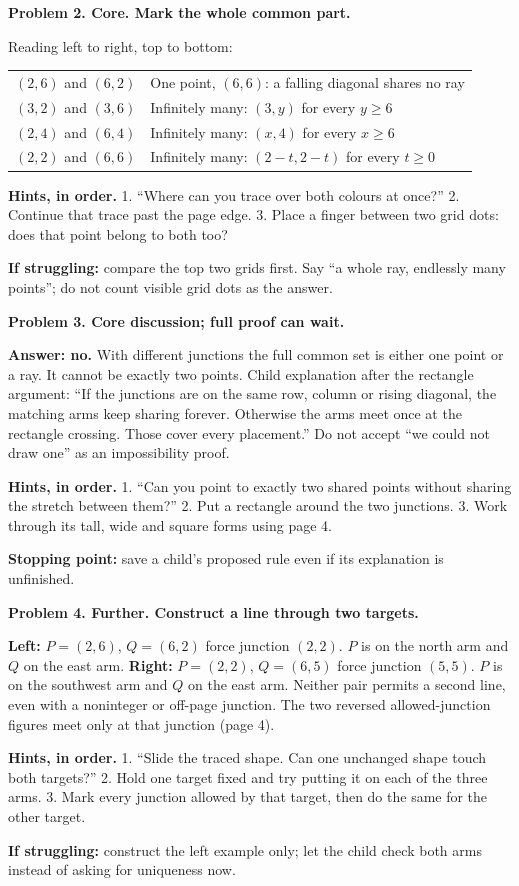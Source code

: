 \documentclass[11pt,letterpaper]{article}
\newcommand{\head}[1]{\par\vspace{4pt}{\large\bfseries #1}\par\vspace{1pt}}
\newcommand{\prob}[2]{\par\vspace{4pt}\textbf{Problem #1. #2}\par}
\newcommand{\hints}[1]{\par\textbf{Hints, in order.} #1\par}
\begin{document}
\head{Student page 3: overlapping rays}
\prob{2}{Core. Mark the whole common part.}
Reading left to right, top to bottom:
\par\noindent\begin{tabularx}{\linewidth}{@{}p{2.0in}X@{}}
$(2,6)$ and $(6,2)$ & One point, $(6,6)$: a falling diagonal shares no ray\\
$(3,2)$ and $(3,6)$ & Infinitely many: $(3,y)$ for every $y\geq6$\\
$(2,4)$ and $(6,4)$ & Infinitely many: $(x,4)$ for every $x\geq6$\\
$(2,2)$ and $(6,6)$ & Infinitely many: $(2-t,2-t)$ for every $t\geq0$
\end{tabularx}
\hints{1. ``Where can you trace over both colours at once?'' 2. Continue that trace past the page edge. 3. Place a finger between two grid dots: does that point belong to both too?}
\textbf{If struggling:} compare the top two grids first. Say ``a whole ray, endlessly many points''; do not count visible grid dots as the answer.
\newpage
\head{Solutions and hints, continued}
\prob{3}{Core discussion; full proof can wait.}
\textbf{Answer: no.} With different junctions the full common set is either one point or a ray. It cannot be exactly two points. Child explanation after the rectangle argument: ``If the junctions are on the same row, column or rising diagonal, the matching arms keep sharing forever. Otherwise the arms meet once at the rectangle crossing. Those cover every placement.'' Do not accept ``we could not draw one'' as an impossibility proof.
\hints{1. ``Can you point to exactly two shared points without sharing the stretch between them?'' 2. Put a rectangle around the two junctions. 3. Work through its tall, wide and square forms using page 4.}
\textbf{Stopping point:} save a child's proposed rule even if its explanation is unfinished.

\prob{4}{Further. Construct a line through two targets.}
\textbf{Left:} $P=(2,6)$, $Q=(6,2)$ force junction $(2,2)$. $P$ is on the north arm and $Q$ on the east arm. \textbf{Right:} $P=(2,2)$, $Q=(6,5)$ force junction $(5,5)$. $P$ is on the southwest arm and $Q$ on the east arm. Neither pair permits a second line, even with a noninteger or off-page junction. The two reversed allowed-junction figures meet only at that junction (page 4).
\hints{1. ``Slide the traced shape. Can one unchanged shape touch both targets?'' 2. Hold one target fixed and try putting it on each of the three arms. 3. Mark every junction allowed by that target, then do the same for the other target.}
\textbf{If struggling:} construct the left example only; let the child check both arms instead of asking for uniqueness now.
\end{document}
